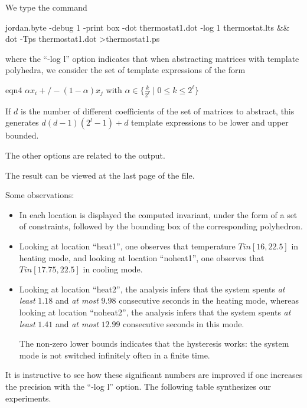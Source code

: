 \documentclass[a4paper,11pt]{article}
\newenvironment{prog}
{\begin{example}\begin{small}\color{prog}}
{\end{small}\end{example}\par}
\begin{document}
We type the command
\begin{prog}
jordan.byte -debug 1 -print box -dot thermostat1.dot -log 1 thermostat.lts &&
dot -Tps thermostat1.dot >thermostat1.ps
\end{prog}
where the ``-log l'' option indicates that when abstracting
matrices with template polyhedra, we consider the set of template
expressions of the form
\begin{center}
\begin{gif}[][130][130]{eqn4}\boldmath
$\alpha x_i +/- (1-\alpha) x_j$
with
$
\alpha\in\{ \frac{k}{2^\ell} \;|\; 0\leq k\leq 2^\ell \}
$
\end{gif}
\end{center}
If $d$ is the
number of different coefficients of the set of matrices to
abstract, this generates $d(d-1)(2^l-1) + d$ template
expressions to be lower and upper bounded.

The other options are related to the output.

The result can be viewed at the last page of the
 file.

Some observations:
\begin{itemize}
\item In each location is displayed the computed invariant, under
  the form of a set of constraints, followed by the bounding box
  of the corresponding polyhedron.

\item Looking at location ``heat1'', one observes that
  temperature $T in [16,22.5]$ in heating mode, and looking at location
  ``noheat1'', one observes that $T in [17.75,22.5]$ in cooling
  mode.

\item Looking at location ``heat2'', the analysis infers that the
  system spents \emph{at least}  $1.18$ and \emph{at most} $9.98$ consecutive seconds in the
  heating mode, whereas looking at location ``noheat2'', the
  analysis infers that the system spents  \emph{at least} $1.41$
  and \emph{at most} $12.99$
  consecutive seconds in this mode.

  The non-zero lower bounds indicates that the hysteresis works:
  the system mode is not switched infinitely often in a finite time.
\end{itemize}

It is instructive to see how these significant numbers are
improved if one increases the precision with the ``-log l''
option. The following table synthesizes our experiments.
\end{document}

